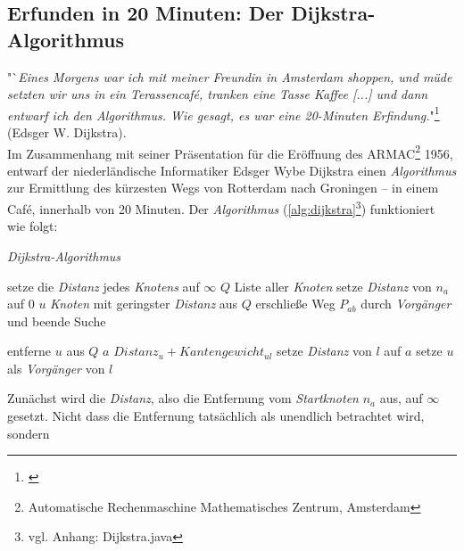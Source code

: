 \documentclass[12pt]{article}
\begin{document}
\subsection{Erfunden in 20 Minuten: Der Dijkstra-Algorithmus}
\label{sec:dijk}
"`{\em Eines Morgens war ich mit meiner Freundin in Amsterdam shoppen, und müde setzten wir uns in ein Terassencafé, tranken eine Tasse Kaffee [...] und dann entwarf ich den Algorithmus. Wie gesagt, es war eine 20-Minuten Erfindung.}"\footnote{\cite[(engl.), S. 42f]{interview}} (Edsger W. Dijkstra).
\\
Im Zusammenhang mit seiner Präsentation für die Eröffnung des ARMAC\footnote{Automatische Rechenmaschine Mathematisches Zentrum, Amsterdam} 1956, entwarf der niederländische Informatiker Edsger Wybe Dijkstra einen \textit{Algorithmus} zur Ermittlung des kürzesten Wegs von Rotterdam nach Groningen -- in einem Café, innerhalb von 20 Minuten. Der \textit{Algorithmus} (\autoref{alg:dijkstra}\footnote{vgl. Anhang: Dijkstra.java}) funktioniert wie folgt:
\begin{algorithm}
\caption{\textit{Dijkstra-Algorithmus} \label{alg:dijkstra}}
\begin{algorithmic}[1]
\Statex
{}
\Statex
{}
	\State setze die \textit{Distanz} jedes  \textit{Knotens} auf $\infty$
	\State \sei $Q$ Liste aller \textit{Knoten}
	\State setze \textit{Distanz} von $n_a$ auf $0$
		\State \sei $u$ \textit{Knoten} mit geringster \textit{Distanz} aus $Q$
			\State erschließe Weg $P_{ab}$ durch \textit{Vorgänger} und beende Suche
		\EndIf		
		
		\State entferne $u$ aus $Q$
			\State \sei $a$ $Distanz_u + Kantengewicht_{ul}$
				\State setze \textit{Distanz} von $l$ auf $a$
				\State setze $u$ als \textit{Vorgänger} von $l$
			\EndIf
		\EndFor
	\EndWhile
\EndProcedure
\end{algorithmic}
\end{algorithm}
\newpage
\noindent Zunächst wird die \textit{Distanz}, also die Entfernung vom \textit{Startknoten} $n_a$ aus, auf $\infty$ gesetzt. Nicht dass die Entfernung tatsächlich als unendlich betrachtet wird, sondern 
\end{document}
